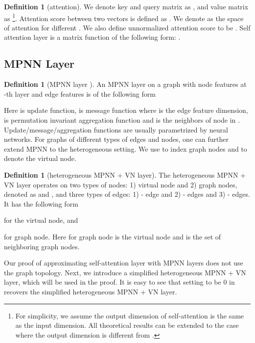 \documentclass[nohyperref]{article}
\theoremstyle{plain}
\theoremstyle{definition}
\newtheorem{definition}[theorem]{Definition}
\theoremstyle{remark}
\begin{document}
\begin{definition}[attention]
We denote key and query matrix as , and value matrix as  \footnote{For simplicity, we assume the output dimension of self-attention is the same as the input dimension. All theoretical results can be extended to the case where the output dimension is different from .}. Attention score between two vectors  is defined as . We denote  as the space of attention  for different . We also define unnormalized attention score  to be .
Self attention layer is a matrix function   of the following form: . \end{definition}

\subsection{MPNN Layer}
\begin{definition}[MPNN layer \citep{gilmer2017neural}]
An MPNN layer on a graph  with node features  at -th layer and edge features  is of the following form


Here  is update function,
 is message function where  is the edge feature dimension, 
 is permutation invariant aggregation function 
and  is the neighbors of node  in .
Update/message/aggregation functions are usually parametrized by neural networks. For graphs of different types of edges and nodes, one can further extend MPNN to the heterogeneous setting.  We use  to index graph nodes and  to denote the virtual node. 
\end{definition}






\begin{definition}[heterogeneous MPNN + VN layer]\label{def-hetero-mpnn-vn-layer} 
The heterogeneous MPNN + VN layer operates on two types of nodes: 1) virtual node and 2) graph nodes, denoted as  and , and three types of edges: 1) - edge and 2) - edges and 3) - edges. It has the following form


for the virtual node, and 

for graph node. Here  for graph node  is the virtual node and  is the set of neighboring graph nodes.
\end{definition}
Our proof of approximating self-attention layer  with MPNN layers does not use the graph topology. Next, we introduce a simplified heterogeneous MPNN + VN layer, which will be used in the proof. It is easy to see that setting  to be 0 in  recovers the simplified heterogeneous MPNN + VN layer.
\end{document}
